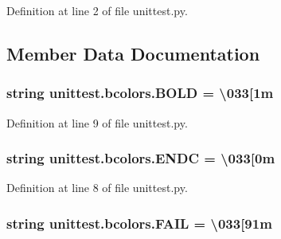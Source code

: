 Definition at line 2 of file unittest.\+py.



\subsection{Member Data Documentation}
\subsubsection[{\texorpdfstring{B\+O\+LD}{BOLD}}]{\setlength{\rightskip}{0pt plus 5cm}string unittest.\+bcolors.\+B\+O\+LD = \textquotesingle{}\textbackslash{}033\mbox{[}1m\textquotesingle{}\hspace{0.3cm}{\ttfamily [static]}}\hypertarget{classunittest_1_1bcolors_a95b491580216e848b313b0918ccea7ea}{}\label{classunittest_1_1bcolors_a95b491580216e848b313b0918ccea7ea}


Definition at line 9 of file unittest.\+py.

\subsubsection[{\texorpdfstring{E\+N\+DC}{ENDC}}]{\setlength{\rightskip}{0pt plus 5cm}string unittest.\+bcolors.\+E\+N\+DC = \textquotesingle{}\textbackslash{}033\mbox{[}0m\textquotesingle{}\hspace{0.3cm}{\ttfamily [static]}}\hypertarget{classunittest_1_1bcolors_a5db993c726eedb06b4a7efab09551f4e}{}\label{classunittest_1_1bcolors_a5db993c726eedb06b4a7efab09551f4e}


Definition at line 8 of file unittest.\+py.

\subsubsection[{\texorpdfstring{F\+A\+IL}{FAIL}}]{\setlength{\rightskip}{0pt plus 5cm}string unittest.\+bcolors.\+F\+A\+IL = \textquotesingle{}\textbackslash{}033\mbox{[}91m\textquotesingle{}\hspace{0.3cm}{\ttfamily [static]}}\hypertarget{classunittest_1_1bcolors_a2dada3141c1e833e5a3cacd4f39dcf47}{}\label{classunittest_1_1bcolors_a2dada3141c1e833e5a3cacd4f39dcf47}


